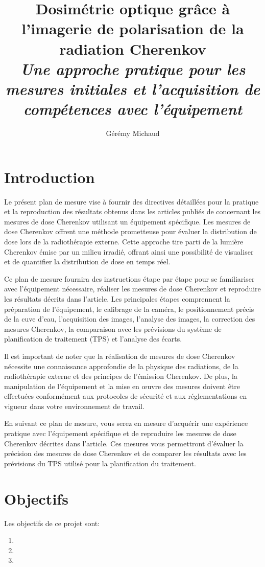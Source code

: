 \documentclass{Thesis}
\title{Dosimétrie optique grâce à l'imagerie de polarisation de la radiation Cherenkov
\\\Large{\textit{Une approche pratique pour les mesures initiales et l'acquisition de compétences avec l'équipement}}}
\author{Gérémy Michaud}{G. Michaud}
\begin{document}
\section*{Introduction}
Le présent plan de mesure vise à fournir des directives détaillées pour la pratique
et la reproduction des résultats obtenus dans les articles publiés de \citeauthor{cloutier_accurate_2022} \cite{cloutier_accurate_2022,cloutier_direct_2022} concernant les mesures de dose Cherenkov utilisant un équipement spécifique. Les mesures de dose Cherenkov offrent une méthode prometteuse pour évaluer la distribution de dose lors de la radiothérapie externe. Cette approche tire parti de la lumière Cherenkov émise par un milieu irradié, offrant ainsi une possibilité de visualiser et de quantifier la distribution de dose en temps réel.

Ce plan de mesure fournira des instructions étape par étape pour se familiariser avec l'équipement nécessaire, réaliser les mesures de dose Cherenkov et reproduire les résultats décrits dans l'article. Les principales étapes comprennent la préparation de l'équipement, le calibrage de la caméra, le positionnement précis de la cuve d'eau, l'acquisition des images, l'analyse des images, la correction des mesures Cherenkov, la comparaison avec les prévisions du système de planification de traitement (TPS) et l'analyse des écarts.

Il est important de noter que la réalisation de mesures de dose Cherenkov nécessite une connaissance approfondie de la physique des radiations, de la radiothérapie externe et des principes de l'émission Cherenkov. De plus, la manipulation de l'équipement et la mise en œuvre des mesures doivent être effectuées conformément aux protocoles de sécurité et aux réglementations en vigueur dans votre environnement de travail.

En suivant ce plan de mesure, vous serez en mesure d'acquérir une expérience pratique avec l'équipement spécifique et de reproduire les mesures de dose Cherenkov décrites dans l'article. Ces mesures vous permettront d'évaluer la précision des mesures de dose Cherenkov et de comparer les résultats avec les prévisions du TPS utilisé pour la planification du traitement.
\section*{Objectifs}
Les objectifs de ce projet sont:
\begin{enumerate}
    \setlength\itemsep{1mm}
    \item 
    \item 
    \item 
\end{enumerate}
\end{document}
